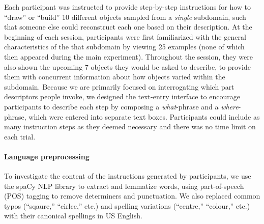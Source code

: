 \documentclass[10pt,letterpaper]{article}
\begin{document}
Each participant was instructed to provide step-by-step instructions for how to ``draw'' or ``build'' 10 different objects sampled from a \textit{single} subdomain, such that someone else could reconstruct each one based on their description.
At the beginning of each session, participants were first familiarized with the general characteristics of the that subdomain by viewing 25 examples (none of which then appeared during the main experiment).
Throughout the session, they were also shown the upcoming 7 objects they would be asked to describe, to provide them with concurrent information about how objects varied within the subdomain.
Because we are primarily focused on interrogating which part descriptors people invoke, we designed the text-entry interface to encourage participants to describe each step by composing a \textit{what}-phrase and a \textit{where}-phrase, which were entered into separate text boxes. 
Participants could include as many instruction steps as they deemed necessary and there was no time limit on each trial.


\paragraph{Language preprocessing} %
To investigate the content of the instructions generated by participants, we use the spaCy NLP library to extract and lemmatize words, using part-of-speech (POS) tagging to remove determiners and punctuation. We also replaced common typos (``sqaure,'' ``cirlce,'' etc.) and spelling variations (``centre,'' ``colour,'' etc.) with their canonical spellings in US English.
\end{document}
